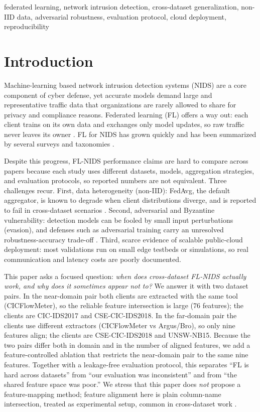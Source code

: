 \documentclass[conference,onecolumn]{IEEEtran}
\begin{document}
\begin{IEEEkeywords}
federated learning, network intrusion detection, cross-dataset generalization, non-IID data,
adversarial robustness, evaluation protocol, cloud deployment, reproducibility
\end{IEEEkeywords}

\section{Introduction}
Machine-learning based network intrusion detection systems (NIDS) are a core component of cyber
defense, yet accurate models demand large and representative traffic data that organizations are
rarely allowed to share for privacy and compliance reasons. Federated learning (FL) offers a way
out: each client trains on its own data and exchanges only model updates, so raw traffic never
leaves its owner \cite{b1}. FL for NIDS has grown quickly and has been summarized by several
surveys and taxonomies \cite{b1,b2,b3,b4}.

Despite this progress, FL-NIDS performance claims are hard to compare across papers because each
study uses different datasets, models, aggregation strategies, and evaluation protocols, so reported
numbers are not equivalent. Three challenges recur. First, data heterogeneity (non-IID): FedAvg, the
default aggregator, is known to degrade when client distributions diverge, and is reported to fail in
cross-dataset scenarios \cite{b4,b5}. Second, adversarial and Byzantine vulnerability: detection
models can be fooled by small input perturbations (evasion), and defenses such as adversarial training
carry an unresolved robustness-accuracy trade-off \cite{b6,b7,b8}. Third, scarce evidence of scalable
public-cloud deployment: most validations run on small edge testbeds or simulations, so real
communication and latency costs are poorly documented.

This paper asks a focused question: \emph{when does cross-dataset FL-NIDS actually work, and why does
it sometimes appear not to?} We answer it with two dataset pairs. In the near-domain pair both clients
are extracted with the same tool (CICFlowMeter), so the reliable feature intersection is large (76
features); the clients are CIC-IDS2017 and CSE-CIC-IDS2018. In the far-domain pair the clients use
different extractors (CICFlowMeter vs Argus/Bro), so only nine features align; the clients are
CSE-CIC-IDS2018 and UNSW-NB15. Because the two pairs differ both in domain and in the number of
aligned features, we add a feature-controlled ablation that restricts the near-domain pair to the same
nine features. Together with a leakage-free evaluation protocol, this separates ``FL is hard across
datasets'' from ``our evaluation was inconsistent'' and from ``the shared feature space was poor.''
We stress that this paper
does \emph{not} propose a feature-mapping method; feature alignment here is plain column-name
intersection, treated as experimental setup, common in cross-dataset work \cite{b5}.
\end{document}
